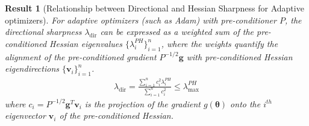 \documentclass[]{fairmeta}
\theoremstyle{plain}
\newtheorem{result}[theorem]{Result}
\theoremstyle{definition}
\begin{document}
\begin{result}[Relationship between Directional and Hessian Sharpness for Adaptive optimizers]
\label{prop:dir_hessian_rel_adam}
For adaptive optimizers (such as Adam) with pre-conditioner $P$, the directional sharpness $\lambda_{\text{dir}}$ can be expressed as a weighted sum of the pre-conditioned Hessian eigenvalues $\{\lambda^{PH}_i\}_{i=1}^n$, where the weights quantify the alignment of the pre-conditioned gradient $P^{-1/2} \bm{g}$ with pre-conditioned Hessian eigendirections $\{\bm{v}_i\}_{i=1}^n$.
\begin{align}
    \lambda_{\text{dir}} = \frac{\sum_{i = 1}^n c_i^2 \lambda_i^{PH}}{\sum_{i = 1}^n c_i^2} \leq \lambda_{\max}^{PH}
\end{align}
where $c_i = P^{-1/2}\bm{g}^T \bm{v}_i$ is the projection of the gradient $g(\bm{\theta})$ onto the $i^{th}$ eigenvector $\bm{v}_i$ of the pre-conditioned Hessian.
\end{result}
\end{document}
